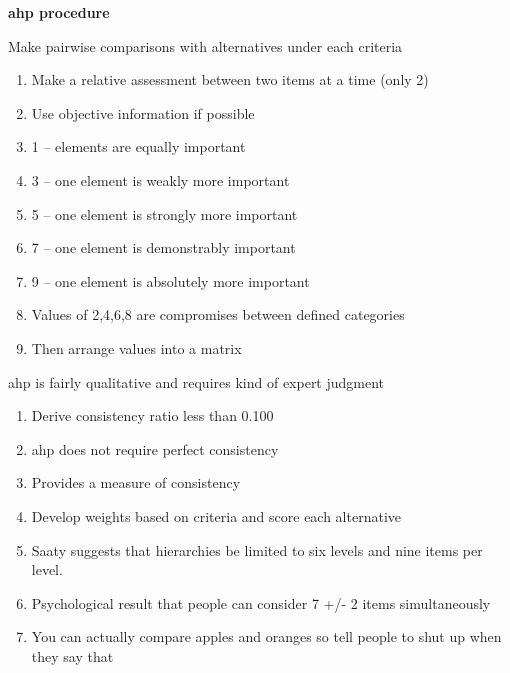 \documentclass[aspectratio=1610,pdftex,dvipsnames,compress,xcolor={dvipsnames}]{beamer}
\newcommand{\acs}{\acrshort} %
\begin{document}
\begin{frame}[plain]{}
    \centering\LARGE\textbf{\acs{ahp} procedure}
\end{frame}


\addtocounter{framenumber}{-1}
\begin{frame}{Make pairwise comparisons with alternatives under each criteria}
    \begin{enumerate}[series=outerlist,topsep=0pt,itemsep=1pt,leftmargin=*,label=(\arabic*)]
        \item[]Make a relative assessment between two items at a time (only 2)  
        \item[]Use objective information if possible
            \vspace{0.15in}
        \item[]1 -- elements are equally important
        \item[]3 -- one element is weakly more important  
        \item[]5 -- one element is strongly more important  
        \item[]7 -- one element is demonstrably important  
        \item[]9 -- one element is absolutely more important
        \item[]Values of 2,4,6,8 are compromises between defined categories
            \vspace{0.15in}
        \item[]Then arrange values into a matrix
    \end{enumerate}
\end{frame}


\begin{frame}{\acs{ahp} is fairly qualitative and requires kind of expert judgment}
    \begin{enumerate}[series=outerlist,topsep=0pt,itemsep=11pt,leftmargin=*,label=(\arabic*)]
        \item[]Derive consistency ratio less than 0.100
        \item[]\acs{ahp} does not require perfect consistency  
        \item[]Provides a measure of consistency
        \item[]Develop weights based on criteria and score each alternative
        \item[]Saaty suggests that hierarchies be limited to six levels and nine items per level.  
        \item[]Psychological result that people can consider 7 +/- 2 items simultaneously
        \item[]You can actually compare apples and oranges so tell people to shut up when they say that
    \end{enumerate}
\end{frame}
\end{document}

